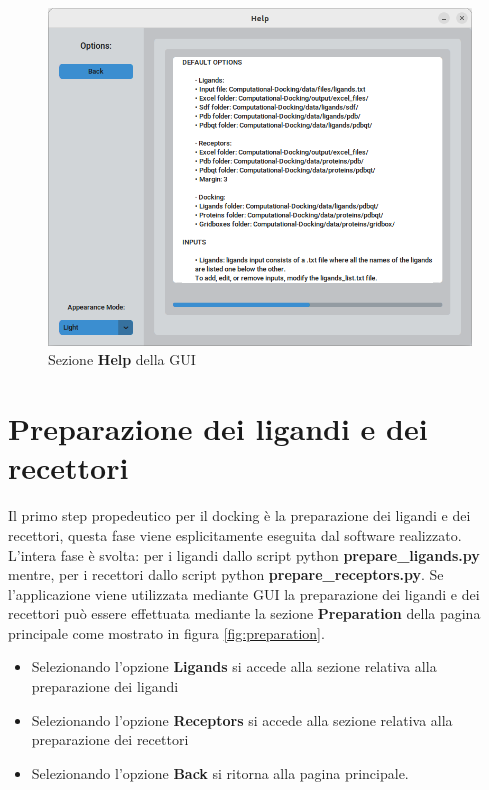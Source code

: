 \begin{figure}[H]
    \centering
    \includegraphics[scale=0.6]{immagini/help.png}
    \caption{Sezione \textbf{Help} della GUI}
    \label{fig:help}
\end{figure}

\section{Preparazione dei ligandi e dei recettori}
Il primo step propedeutico per il docking è la preparazione dei ligandi e dei recettori, questa
fase viene esplicitamente eseguita dal software realizzato. L'intera fase è svolta: per i ligandi dallo script python \textbf{prepare\_ligands.py} mentre, per i recettori dallo script python \textbf{prepare\_receptors.py}. Se l'applicazione viene utilizzata mediante GUI la preparazione dei ligandi e dei recettori può essere effettuata mediante la sezione \textbf{Preparation} della pagina principale come mostrato in figura \ref{fig:preparation}.

\begin{itemize}
    \item Selezionando l'opzione \textbf{Ligands} si accede alla sezione relativa alla preparazione dei ligandi
    \item Selezionando l'opzione \textbf{Receptors} si accede alla sezione relativa alla preparazione dei recettori
    \item Selezionando l'opzione \textbf{Back} si ritorna alla pagina principale.
\end{itemize}



